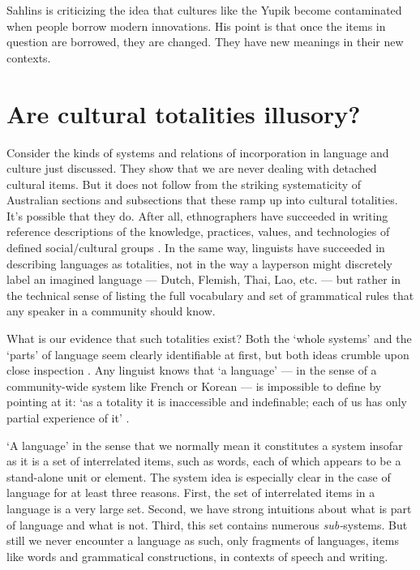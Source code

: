Sahlins is criticizing the idea that cultures like the Yupik 
become contaminated when people borrow modern innovations. His point is that once the items in question are borrowed, they are changed. They have new meanings in their new contexts. 



\section{Are cultural totalities illusory?}

Consider the kinds of systems and relations of incorporation in language and 
culture just discussed. They show that we are never dealing with 
detached cultural items. But it does not follow from the striking 
systematicity of Australian sections and subsections that 
these ramp up into cultural totalities. It's possible that they do. After all, ethnographers have 
succeeded in writing reference descriptions of the knowledge, practices, 
values, and technologies of defined social/cultural groups  \citep{radcliffe-brown_andaman_1922,bronislaw_malinowski_argonauts_1922,firth_we_1936,evans-pritchard_nuer:_1940,fortes_dynamics_1945}. In the same way, linguists have succeeded in describing languages as 
totalities, not in the way a layperson might discretely label an 
imagined language --- Dutch, Flemish, Thai, Lao, etc. --- but rather in the technical sense of listing the full vocabulary and set of 
grammatical rules that any speaker in a community should know. 



What is our evidence that such totalities exist? Both the \textquoteleft whole 
systems' and the \textquoteleft parts' of language seem clearly identifiable at first, but both ideas crumble upon close inspection \citep{le_page_acts_1985,hudson_sociolinguistics_1996}. Any linguist knows that 
\textquoteleft a language' --- in the sense of a community-wide system like French or 
Korean --- is impossible to define by pointing at 
it: \textquoteleft as a totality it is inaccessible and indefinable; each of us has 
only partial experience of it' \citep[191]{le_page_acts_1985}. 



`A language' in the sense that we normally mean it constitutes a system 
insofar as it is a set of interrelated items, such as words, each of 
which appears to be a stand-alone unit or element. The system idea is 
especially clear in the case of language for at least three reasons. First, the set of 
interrelated items in a language is a very large set. Second, we have 
strong intuitions about what is part of language and what is not. Third, this set contains numerous \textit{sub-}systems. 
But still we never encounter a language as such, only fragments of 
languages, items like words and grammatical constructions, in contexts of speech and writing. 



